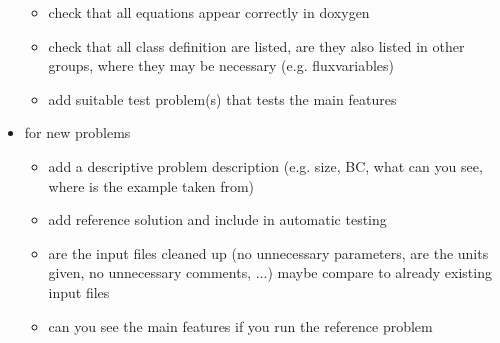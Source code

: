 \begin{itemize}
\begin{itemize}
    \item check that all equations appear correctly in doxygen
    \item check that all class definition are listed, are they also listed in
          other groups, where they may be necessary (e.g. fluxvariables)
    \item add suitable test problem(s) that tests the main features
  \end{itemize}
  \item for new problems
  \begin{itemize}
    \item add a descriptive problem description (e.g. size, BC, what can you see,
          where is the example taken from)
    \item add reference solution and include in automatic testing
    \item are the input files cleaned up (no unnecessary parameters, are the units given,
          no unnecessary comments, ...) maybe compare to already existing input files
    \item can you see the main features if you run the reference problem
  \end{itemize}
\end{itemize}